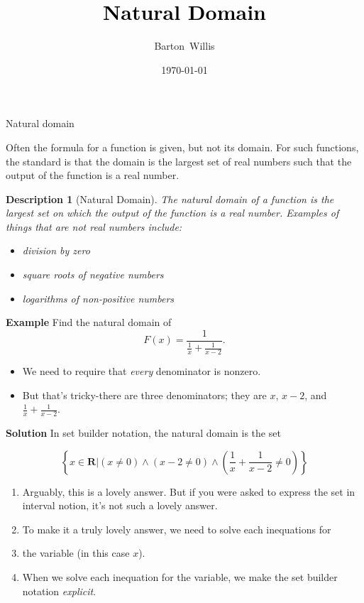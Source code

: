 \documentclass[usenames,dvipsnames,fleqn,leqno,10pt, pdflatex]{beamer}
\author[bw]{}
\title[] %
{\textcolor{black}{\textbf{Natural Domain}} \\ 
\vspace{0.2in}
}
\date{\today}
\author[] %
{Barton~Willis}
\newcommand{\reals}{\mathbf{R}}
\newenvironment{PenList}{
  \begin{enumerate}[\textcolor{UNK-blue}{\PencilRightDown}]
    \addtolength{\itemsep}{-0.0\itemsep}}
  {\end{enumerate}}
\newtheorem{describ}{Description}
\begin{document}
\frame{\titlepage}

\begin{frame}{Natural domain}

Often the formula for a function is given, but not its domain. For
such functions, the standard is that the domain is the largest
set of real numbers such that the output of the function is a real number.

\begin{describ}[Natural Domain] The \emph{natural domain} of a function is the
        largest set on which the output of the function is a
        real number.  Examples of things that are \emph{not} real
        numbers include:
        \begin{itemize}
            \item division by zero
            \item square roots of negative numbers
            \item logarithms of non-positive numbers
        \end{itemize}
\end{describ}
    
\end{frame}
\begin{frame}

\textbf{Example} Find the natural domain of 
\begin{equation*}
    F(x) = \frac{1}{\frac{1}{x} + \frac{1}{x-2}}.
\end{equation*}

\begin{itemize}
    \item We need to require that \emph{every} denominator is nonzero.
    \item But that's tricky-there are three denominators; they are
    $x$, $x-2$, and $\frac{1}{x} + \frac{1}{x-2}$.
    
\end{itemize}

\textbf{Solution} In set builder notation, the natural domain is the set

\begin{equation*}
    \left\{ x \in \reals \bigg | \left(x \neq 0 \right)  
    \land \left(x-2 \neq 0 \right) \land  
    \left(\frac{1}{x} + \frac{1}{x-2} \neq 0 \right) \right\}
\end{equation*}

\begin{PenList}

    \item Arguably, this is a lovely answer. But if you were asked to express the
    set in interval notion, it's not such a lovely answer.

    \item To make it a truly lovely answer, we need to solve each inequations for 
    \item the variable (in this case  $x$).
    \item When we solve each inequation for the variable, we make the
    set builder notation \emph{explicit}.
    
\end{PenList}
\end{frame}
\end{document}
